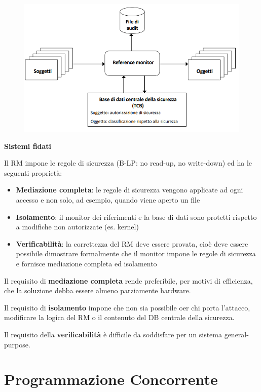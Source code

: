 \documentclass{article}
\begin{document}
\begin{figure}[htbp]
    \centering
    \includegraphics[width=0.70\columnwidth]{imgs/elevata_sicurezza.PNG}
\end{figure}

\vspace{3mm}
\textbf{Sistemi fidati}
\vspace{3mm}

Il RM impone le regole di sicurezza (B-LP: no read-up, no write-down) ed ha le seguenti proprietà:
\begin{itemize}
    \item \textbf{Mediazione completa}: le regole di sicurezza vengono applicate ad ogni accesso e non solo, ad esempio, quando viene aperto un file
    \item \textbf{Isolamento}: il monitor dei riferimenti e la base di dati sono protetti rispetto a modifiche non autorizzate (es. kernel)
    \item \textbf{Verificabilità}: la correttezza del RM deve essere provata, cioè deve essere possibile dimostrare formalmente che il monitor impone le regole
    di sicurezza e fornisce mediazione completa ed isolamento
\end{itemize}

\vspace{3mm}
Il requisito di \textbf{mediazione completa} rende preferibile, per motivi di efficienza, che la soluzione debba essere almeno parziamente hardware.

\vspace{3mm}
Il requisito di \textbf{isolamento} impone che non sia possibile oer chi porta l'attacco, modificare la logica del RM o il contenuto del DB centrale della sicurezza.

\vspace{3mm}
Il requisito della \textbf{verificabilità} è difficile da soddisfare per un sistema general-purpose.

\section{Programmazione Concorrente}
\end{document}
